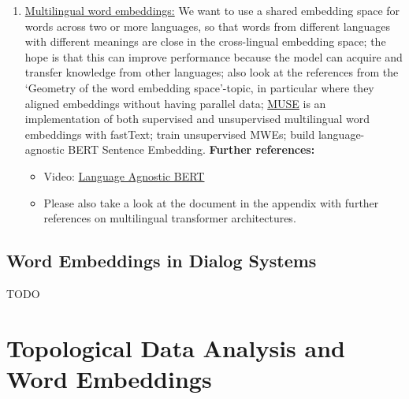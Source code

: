 \documentclass[11pt, a4paper]{amsart}
\begin{document}
\begin{enumerate}[resume]
    \item \underline{Multilingual word embeddings:}
    \newline
    We want to use a shared embedding space for words across two or more languages, so that words from different languages with different meanings are close in the cross-lingual embedding space;
    the hope is that this can improve performance because the model can acquire and transfer knowledge from other languages;
    also look at the references from the `Geometry of the word embedding space'-topic, in particular \cite{DBLP:journals/corr/abs-1710-04087} where they aligned embeddings without having parallel data;
    \href{https://github.com/facebookresearch/MUSE}{MUSE} is an implementation of both supervised and unsupervised multilingual word embeddings with fastText;
    \cite{DBLP:journals/corr/abs-1808-08933} train unsupervised MWEs;
    \cite{DBLP:journals/corr/abs-2007-01852} build language-agnostic BERT Sentence Embedding.
    \newline
    \textbf{Further references:}
    \begin{itemize}
        \item Video: \href{https://youtu.be/7tAWk_Coj-s}{Language Agnostic BERT}
        \item Please also take a look at the document in the appendix with further references on multilingual transformer architectures.
    \end{itemize}
\end{enumerate}

\subsection{Word Embeddings in Dialog Systems}

TODO

\section{Topological Data Analysis and Word Embeddings}
\end{document}
